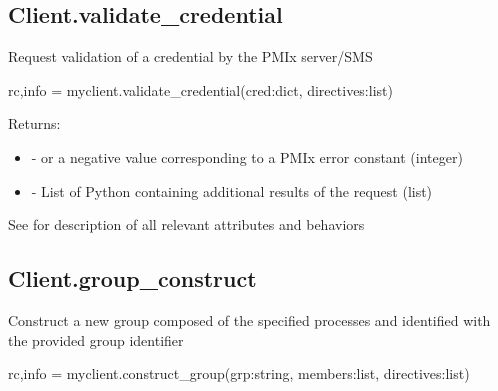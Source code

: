 \subsection{Client.validate_credential}

\summary

Request validation of a credential by the PMIx server/SMS

\format

\pyspecificstart
\begin{codepar}
rc,info = myclient.validate_credential(cred:dict, directives:list)
\end{codepar}
\pyspecificend

\begin{arglist}
\end{arglist}

Returns:

\begin{itemize}
    \item {} -  or a negative value corresponding to a PMIx error constant (integer)
    \item {} - List of Python  containing additional results of the request (list)
\end{itemize}


See  for description of all relevant attributes and behaviors


\subsection{Client.group_construct}

\summary

Construct a new group composed of the specified processes and identified with
the provided group identifier

\format

\pyspecificstart
\begin{codepar}
rc,info = myclient.construct_group(grp:string, members:list, directives:list)
\end{codepar}
\pyspecificend

